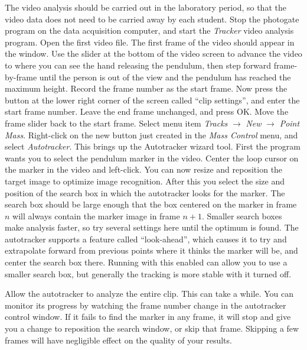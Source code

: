 \documentclass{revtex4}
\begin{document}
The video analysis should be carried out in the laboratory
period, so that the video data does not need to be carried away by each
student.  Stop the photogate program on the data acquisition computer, and
start the {\em Tracker}\cite{trackerprog}
video analysis program.  Open the first video file.
The first frame of the video should appear in the window.  Use the slider
at the bottom of the video screen to advance the video to where you can see
the hand releasing the pendulum, then step forward frame-by-frame until the
person is out of the view and the pendulum has reached the maximum height.
Record the frame number as the start frame.  Now press the button at the
lower right corner of the screen called ``clip settings'', and enter the
start frame number.  Leave the end frame unchanged, and press OK.  Move the
frame slider back to the start frame.  Select menu item {\em Tracks}
$\rightarrow$ {\em New} $\rightarrow$ {\em Point Mass}.  Right-click on
the new button just created in the {\em Mass Control} menu, and select
{\em Autotracker}.  This brings up the Autotracker wizard tool.  First
the program wants you to select the pendulum marker in the video.  Center
the loop cursor on the marker in the video and left-click.  You can now
resize and reposition the target image to optimize image recognition.  After
this you select the size and position of the search box in which the
autotracker looks for the marker.  The search box should be large enough
that the box centered on the marker in frame $n$ will always contain the
marker image in frame $n+1$.  Smaller search boxes make analysis faster,
so try several settings here until the optimum is found.  The autotracker
supports a feature called ``look-ahead'', which causes it to try and
extrapolate forward from previous points where it thinks the marker will
be, and center the search box there.  Running with this enabled can allow
you to use a smaller search box, but generally the tracking is more stable
with it turned off.

Allow the autotracker to analyze the entire clip.  This can take a while.
You can monitor its progress by watching the frame number change in the
autotracker control window.  If it fails to find the marker in any frame,
it will stop and give you a change to reposition the search window, or
skip that frame.  Skipping a few frames will have negligible effect on
the quality of your results.
\end{document}
